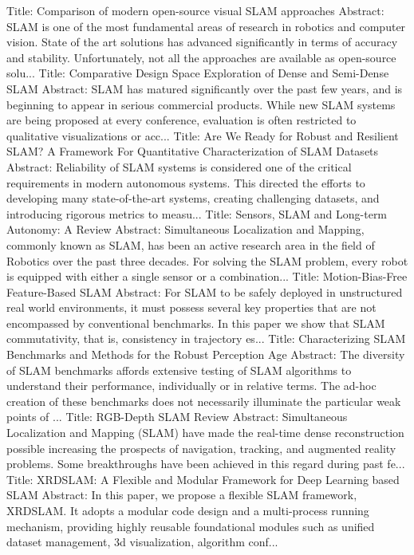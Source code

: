 \documentclass[conference]{IEEEtran}
\begin{document}
\cite{key1} Title: Comparison of modern open-source visual SLAM approaches
Abstract:   SLAM is one of the most fundamental areas of research in robotics and
computer vision. State of the art solutions has advanced significantly in terms
of accuracy and stability. Unfortunately, not all the approaches are available
as open-source solu...
\cite{key2} Title: Comparative Design Space Exploration of Dense and Semi-Dense SLAM
Abstract:   SLAM has matured significantly over the past few years, and is beginning to
appear in serious commercial products. While new SLAM systems are being
proposed at every conference, evaluation is often restricted to qualitative
visualizations or acc...
\cite{key3} Title: Are We Ready for Robust and Resilient SLAM? A Framework For Quantitative
  Characterization of SLAM Datasets
Abstract:   Reliability of SLAM systems is considered one of the critical requirements in
modern autonomous systems. This directed the efforts to developing many
state-of-the-art systems, creating challenging datasets, and introducing
rigorous metrics to measu...
\cite{key4} Title: Sensors, SLAM and Long-term Autonomy: A Review
Abstract:   Simultaneous Localization and Mapping, commonly known as SLAM, has been an
active research area in the field of Robotics over the past three decades. For
solving the SLAM problem, every robot is equipped with either a single sensor
or a combination...
\cite{key5} Title: Motion-Bias-Free Feature-Based SLAM
Abstract:   For SLAM to be safely deployed in unstructured real world environments, it
must possess several key properties that are not encompassed by conventional
benchmarks. In this paper we show that SLAM commutativity, that is, consistency
in trajectory es...
\cite{key6} Title: Characterizing SLAM Benchmarks and Methods for the Robust Perception Age
Abstract:   The diversity of SLAM benchmarks affords extensive testing of SLAM algorithms
to understand their performance, individually or in relative terms. The ad-hoc
creation of these benchmarks does not necessarily illuminate the particular
weak points of ...
\cite{key7} Title: RGB-Depth SLAM Review
Abstract:   Simultaneous Localization and Mapping (SLAM) have made the real-time dense
reconstruction possible increasing the prospects of navigation, tracking, and
augmented reality problems. Some breakthroughs have been achieved in this
regard during past fe...
\cite{key8} Title: XRDSLAM: A Flexible and Modular Framework for Deep Learning based SLAM
Abstract:   In this paper, we propose a flexible SLAM framework, XRDSLAM. It adopts a
modular code design and a multi-process running mechanism, providing highly
reusable foundational modules such as unified dataset management, 3d
visualization, algorithm conf...
\end{document}
